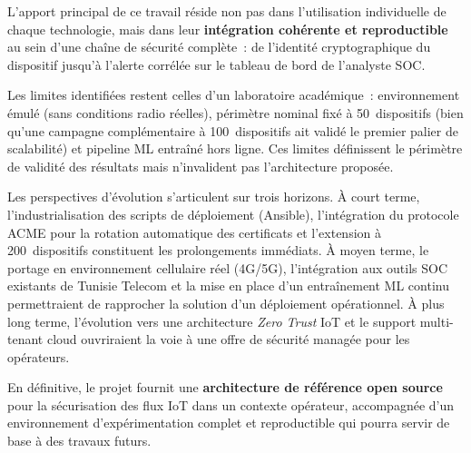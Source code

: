 L'apport principal de ce travail réside non pas dans l'utilisation individuelle de chaque technologie, mais dans leur \textbf{intégration cohérente et reproductible} au sein d'une chaîne de sécurité complète~: de l'identité cryptographique du dispositif jusqu'à l'alerte corrélée sur le tableau de bord de l'analyste SOC.

Les limites identifiées restent celles d'un laboratoire académique~: environnement émulé (sans conditions radio réelles), périmètre nominal fixé à 50~dispositifs (bien qu'une campagne complémentaire à 100~dispositifs ait validé le premier palier de scalabilité) et pipeline ML entraîné hors ligne. Ces limites définissent le périmètre de validité des résultats mais n'invalident pas l'architecture proposée.

Les perspectives d'évolution s'articulent sur trois horizons. À court terme, l'industrialisation des scripts de déploiement (Ansible), l'intégration du protocole ACME pour la rotation automatique des certificats et l'extension à 200~dispositifs constituent les prolongements immédiats. À moyen terme, le portage en environnement cellulaire réel (4G/5G), l'intégration aux outils SOC existants de Tunisie Telecom et la mise en place d'un entraînement ML continu permettraient de rapprocher la solution d'un déploiement opérationnel. À plus long terme, l'évolution vers une architecture \emph{Zero Trust} IoT et le support multi-tenant cloud ouvriraient la voie à une offre de sécurité managée pour les opérateurs.

En définitive, le projet fournit une \textbf{architecture de référence open source} pour la sécurisation des flux IoT dans un contexte opérateur, accompagnée d'un environnement d'expérimentation complet et reproductible qui pourra servir de base à des travaux futurs.
